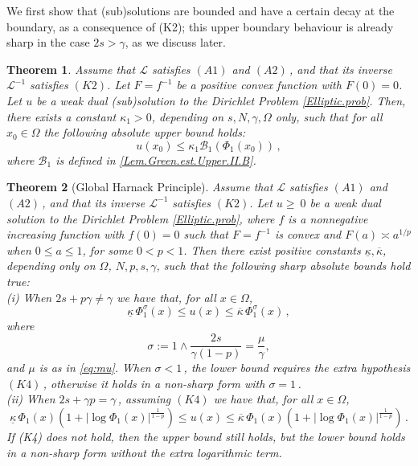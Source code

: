 \documentclass[11pt]{article}
\newtheorem{thm}{Theorem}[section]
\numberwithin{equation}{section}
\newcommand{\A}{\mathcal{L}}
\newcommand{\AI}{\mathcal{L}^{-1}}
\newcommand{\n}{F}
\newcommand{\ka}{\overline{\kappa}}
\newcommand{\kb}{\underline{\kappa}}
\newcommand{\B}{\mathcal{B}}
\begin{document}
We first show that (sub)solutions are bounded and have a certain decay at the boundary, as a consequence of (K2); this upper boundary behaviour is already sharp in the case $2s>\gamma$, as we discuss later.
%
\begin{thm}\label{Thm.upper.ell}Assume that $\A$ satisfies  $(A1)$ and $(A2)$\,, and that its inverse $\AI$ satisfies $(K2)$. Let $\n=f^{-1}$ be a positive convex function with $\n(0)=0$. Let $u$ be a weak dual (sub)solution to the Dirichlet Problem \eqref{Elliptic.prob}.
Then, there exists a constant $\kappa_1>0$, depending on $s,N,\gamma,\Omega$ only,  such that for all $x_0\in \Omega$ the following absolute upper bound holds:
\begin{equation}\label{Lem.Green.2.est.Upper.II}u(x_0) \le \kappa_1\B_1(\Phi_1(x_0))\,,
\end{equation}
where $\B_1$ is defined in \eqref{Lem.Green.est.Upper.II.B}.
\end{thm}\vspace{-2mm}
%
\begin{thm}[Global Harnack Principle]\label{Thm.Elliptic.Harnack.m}Assume that $\A$ satisfies  $(A1)$ and $(A2)$\,, and that its inverse $\AI$ satisfies $(K2)$.
Let $u\ge~ 0$ be a weak dual solution to the Dirichlet Problem \eqref{Elliptic.prob}, where $f$ is a nonnegative increasing function with $f(0)=0$ such that $\n=f^{-1}$ is convex and $\n(a)\asymp a^{1/p}$ when $0\leq a\le 1$, for some $0<p<1$.
Then there exist positive constants $\kb,\ka$, depending only on $\Omega$, $N, p, s,\gamma$,
such that the following sharp absolute bounds hold true: \\
(i) When $2s+p\gamma \ne \gamma$ we have that, for all $x\in \Omega$,
\begin{equation}\label{Thm.Elliptic.Harnack.ineq.m.1}
\kb\, \Phi_1^{\sigma}(x) \le u(x)\le \ka\,\Phi_1^{\sigma}(x) \,,
\end{equation}
where
\begin{equation}
\label{eq:sigma}
\sigma:=1\wedge\frac{2s}{\gamma(1-p)}=\frac{\mu}{\gamma},
\end{equation}
and $\mu$ is as in \eqref{eq:mu}.
When $\sigma<1$\,, the lower bound requires the extra hypothesis $(K4)$\,, otherwise it holds in a non-sharp form with $\sigma=1$\,.\\
(ii) When $2s+\gamma p=\gamma$\,, assuming $(K4)$ we have that, for all $x\in \Omega$,
\begin{equation}\label{Thm.Elliptic.Harnack.ineq.m.log}
\kb\, \Phi_1(x)\left(1+|\log\Phi_1(x) |^{\frac{1}{1-p}}\right) \le u(x)\le \ka\,\Phi_1(x)\left(1+|\log\Phi_1(x) |^{\frac{1}{1-p}}\right)\,.
\end{equation}
If (K4) does not hold, then the upper bound still holds, but the lower bound holds
in a non-sharp form without the extra logarithmic term.
\end{thm}
\end{document}

